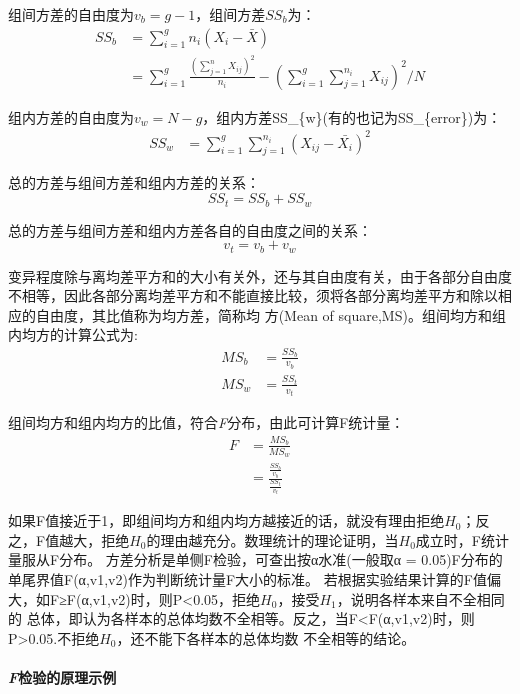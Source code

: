 \documentclass[
]{article}
\begin{document}
组间方差的自由度为\(v_b=g-1\)，组间方差\(SS_{b}\)为：
\[\begin{aligned}
SS_{b} &= \sum_{i=1}^gn_i(X_{i}-\bar{X})\\
 &= \sum_{i=1}^g\frac{(\sum_{j=1}^nX_{ij})^2}{n_i}-(\sum_{i=1}^g\sum_{j=1}^{n_i}X_{ij})^2/N
\end{aligned}\]

组内方差的自由度为\(v_w=N-g\)，组内方差SS\_\{w\}(有的也记为SS\_\{error\})为：
\[\begin{aligned}
SS_{w} &= \sum_{i=1}^g\sum_{j=1}^{n_i}(X_{ij}-\bar{X_i})^2
\end{aligned}\]

总的方差与组间方差和组内方差的关系：
\[SS_{t}=SS_{b}+SS_{w}\]

总的方差与组间方差和组内方差各自的自由度之间的关系：
\[v_{t}=v_{b}+v_{w}\]

变异程度除与离均差平方和的大小有关外，还与其自由度有关，由于各部分自由度不相等，因此各部分离均差平方和不能直接比较，须将各部分离均差平方和除以相应的自由度，其比值称为均方差，简称均
方(Mean of square,MS)。组间均方和组内均方的计算公式为:
\[\begin{aligned}
MS_{b} &= \frac{SS_b}{v_b}\\
MS_{w} &= \frac{SS_t}{v_t}
\end{aligned}\]

组间均方和组内均方的比值，符合\emph{F}分布，由此可计算F统计量：
\[\begin{aligned}
F &= \frac{MS_b}{MS_w}\\
  &= \frac{\frac{SS_b}{v_b}}{\frac{SS_t}{v_t}}
\end{aligned}\]

如果F值接近于1，即组间均方和组内均方越接近的话，就没有理由拒绝\(H_0\)；反之，F值越大，拒绝\(H_0\)的理由越充分。数理统计的理论证明，当\(H_0\)成立时，F统计量服从F分布。
方差分析是单侧F检验，可查出按α水准(一般取α = 0.05)F分布的单尾界值F(α,v1,v2)作为判断统计量F大小的标准。
若根据实验结果计算的F值偏大，如F≥F(α,v1,v2)时，则P\textless0.05，拒绝\(H_0\)，接受\(H_1\)，说明各样本来自不全相同的
总体，即认为各样本的总体均数不全相等。反之，当F\textless F(α,v1,v2)时，则P\textgreater0.05.不拒绝\(H_0\)，还不能下各样本的总体均数
不全相等的结论。

\hypertarget{fux68c0ux9a8cux7684ux539fux7406ux793aux4f8b}{%
\paragraph{\texorpdfstring{\emph{F}检验的原理示例}{F检验的原理示例}}\label{fux68c0ux9a8cux7684ux539fux7406ux793aux4f8b}}
\end{document}

